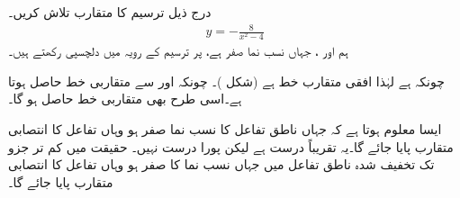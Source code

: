 درج ذیل ترسیم کا متقارب تلاش کریں۔
\begin{align*}
y=-\frac{8}{x^2-4}
\end{align*}
ہم  اور ، جہاں نسب نما صفر ہے، پر ترسیم کے رویہ میں دلچسپی رکھتے ہیں۔

چونکہ    ہے لہٰذا افقی متقارب خط  ہے (شکل )۔ چونکہ  اور  سے  متقاربی خط حاصل ہوتا ہے۔اسی طرح  بھی متقاربی خط حاصل ہو گا۔ 

ایسا معلوم ہوتا ہے کہ جہاں ناطق تفاعل کا نسب نما صفر ہو وہاں تفاعل کا انتصابی متقارب پایا جائے گا۔یہ تقریباً درست ہے لیکن پورا درست نہیں۔ حقیقت میں کم تر جزو تک تخفیف شدہ    ناطق تفاعل    میں جہاں نسب نما کا صفر ہو وہاں تفاعل کا انتصابی متقارب پایا جائے گا۔

